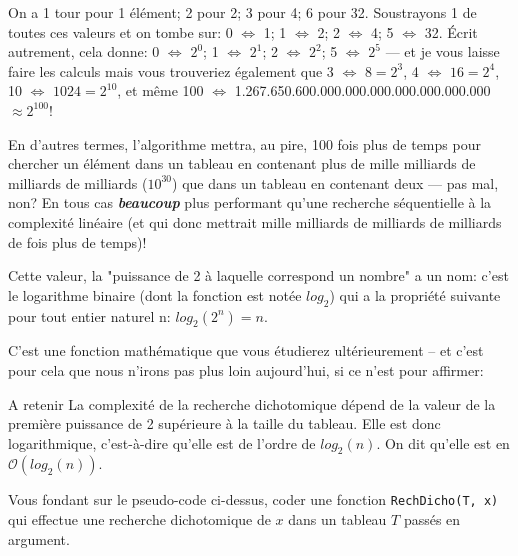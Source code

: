 \documentclass[12pt]{article}
\begin{document}
\begin{MaReponse}
\begin{alphenum}
			\vspace{\baselineskip}
			\item On a 1 tour pour 1 élément; 2 pour 2; 3 pour 4; 6 pour 32. Soustrayons 1 de toutes ces valeurs et on tombe sur: 0 $\Leftrightarrow$ 1; 1 $\Leftrightarrow$ 2; 2 $\Leftrightarrow$ 4; 5 $\Leftrightarrow$ 32. Écrit autrement, cela donne: 0 $\Leftrightarrow$ $2^{0}$; 1 $\Leftrightarrow$ $2^{1}$; 2 $\Leftrightarrow$ $2^{2}$; 5 $\Leftrightarrow$ $2^{5}$ --- et je vous laisse faire les calculs mais vous trouveriez également que 3 $\Leftrightarrow$ $8 = 2^{3}$, 4 $\Leftrightarrow$ $16 = 2^{4}$, 10 $\Leftrightarrow$ $1024 = 2^{10}$,  et même 100 $\Leftrightarrow$ 1.267.650.600.000.000.000.000.000.000.000 $\approx 2^{100}$!
			
			En d'autres termes, l'algorithme mettra, au pire, 100 fois plus de temps pour chercher un élément dans un tableau en contenant plus de mille milliards de milliards de milliards ($10^{30}$) que dans un tableau en contenant deux --- pas mal, non? En tous cas \textbf{\textit{beaucoup}} plus performant qu'une recherche séquentielle à la complexité linéaire (et qui donc mettrait mille milliards de milliards de milliards de fois plus de temps)!
		\end{alphenum}
	\end{MaReponse}	
	
	
	Cette valeur, la "puissance de 2 à laquelle correspond un nombre" a un nom: c'est le logarithme binaire (dont la fonction est notée $log_2$) qui a la propriété suivante pour tout entier naturel n: $log_2(2^n) = n$.
	
	C'est une fonction mathématique que vous étudierez ultérieurement -- et c'est pour cela que nous n'irons pas plus loin aujourd'hui, si ce n'est pour affirmer:
	
	\begin{MonAmp}{A retenir}
		La complexité de la recherche dichotomique dépend de la valeur de la première puissance de 2 supérieure à la taille du tableau. Elle est donc logarithmique, c'est-à-dire qu'elle est de l'ordre de $log_2(n)$. On dit qu’elle est en  $\mathcal{O}(log_2(n))$.
	\end{MonAmp}
	
	\begin{MonExo}
		Vous fondant sur le pseudo-code ci-dessus, coder une fonction \texttt{RechDicho(T, x)} qui effectue une recherche dichotomique de $x$ dans un tableau $T$ passés en argument.
	\end{MonExo}
	\begin{MaReponse}
	\end{MaReponse}
\end{document}
